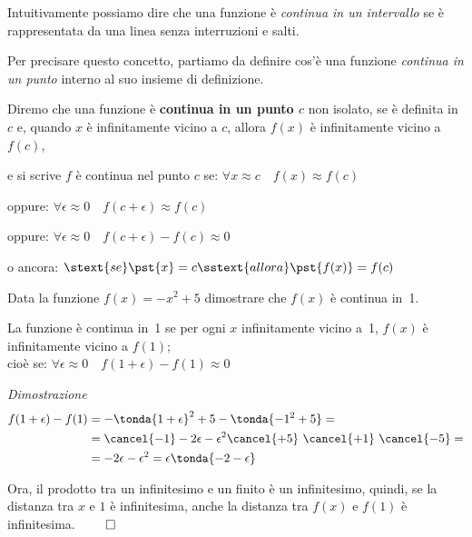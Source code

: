 Intuitivamente possiamo dire che una funzione è 
\emph{continua in un intervallo} 
se è rappresentata da una linea senza interruzioni e salti.

Per precisare questo concetto, partiamo da definire cos'è una funzione 
\emph{continua in un punto} interno al suo insieme di definizione.

\begin{definizione}
Diremo che una funzione è \textbf{continua in un punto \(c\)} non isolato, 
se è definita in \(c\) e, 
quando \(x\) è infinitamente vicino a \(c\), 
allora \(f(x)\) è infinitamente vicino a \(f(c)\), 

\vspace{1em}
e si scrive \(f\) è continua nel punto \(c\) se: \hspace{12mm}
\(\forall x \approx c \quad f(x) \approx f(c)\)

\vspace{.5em}
oppure: \hspace{58mm}
\(\forall \epsilon \approx 0 \quad f(c + \epsilon) \approx f(c)\)

\vspace{.5em}
oppure: \hspace{58mm}
\(\forall \epsilon \approx 0 \quad f(c + \epsilon) - f(c) \approx 0\)

\vspace{.5em}
o ancora: \hspace{54mm}
\(\stext{se } \pst{x} = c \sstext{allora} \pst{f(x)} = f(c)\)
\end{definizione}

\begin{esempio}
Data la funzione \(f(x)=-x^2+5\) dimostrare che \(f(x)\) è continua in~1.

{
La funzione è continua in~1 se per ogni \(x\) infinitamente vicino a~1, 
\(f(x)\) è infinitamente vicino a \(f(1)\); \\
cioè se: \quad 
\(\forall \epsilon \approx 0 \quad f(1 + \epsilon) - f(1) \approx 0\)

\emph{Dimostrazione}
\begin{align*}
f(1+\epsilon) - f(1) &= 
-\tonda{1+\epsilon}^2+5-\tonda{-1^2+5}=\\
&=\cancel{-1}-2\epsilon-\epsilon^2 \cancel{+5}~
  \cancel{+1}~\cancel{-5} = \\
&=-2\epsilon-\epsilon^2 = 
\epsilon \tonda{-2 - \epsilon}
\end{align*}
}{
\scalebox{1}{\contprimo}
}
Ora, il prodotto tra un infinitesimo e un finito è un infinitesimo, quindi, 
se la distanza tra \(x\) e \(1\) è infinitesima, anche la distanza tra 
\(f(x)\) e \(f(1)\) è infinitesima. \hfill \(\qed\) 
 
\end{esempio}

